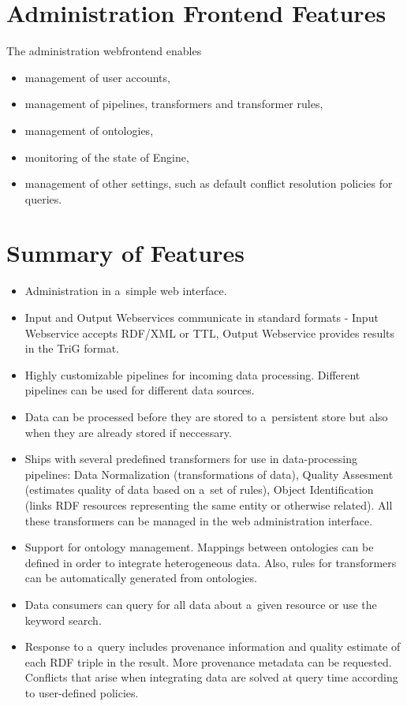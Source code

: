 \section{Administration Frontend Features}
The administration webfrontend enables
\begin{itemize}
  \item management of user accounts,
  \item management of pipelines, transformers and transformer rules,
  \item management of ontologies,
  \item monitoring of the state of Engine,
  \item management of other settings, such as default conflict resolution policies for queries.  
\end{itemize}

\section{Summary of Features}

\begin{itemize}
  \item Administration in a~simple web interface.
  \item Input and Output Webservices communicate in standard formats - Input Webservice accepts RDF/XML or TTL, Output Webservice provides results in the TriG format. 
  \item Highly customizable pipelines for incoming data processing. Different pipelines can be used for different data sources.
  \item Data can be processed before they are stored to a~persistent store but also when they are already stored if neccessary.
  \item Ships with several predefined transformers for use in data-processing pipelines: Data Normalization (transformations of data), Quality Assesment (estimates quality of data based on a~set of rules), Object Identification (links RDF resources representing the same entity or otherwise related). All these transformers can be managed in the web administration interface.
  \item Support for ontology management. Mappings between ontologies can be defined in order to integrate heterogeneous data. Also, rules for  transformers can be automatically generated from ontologies.
  \item Data consumers can query for all data about a~given resource or use the keyword search.
  \item Response to a~query includes provenance information and quality estimate of each RDF triple in the result. More provenance metadata can be requested. Conflicts that arise when integrating data are solved at query time according to user-defined policies. 
\end{itemize}


